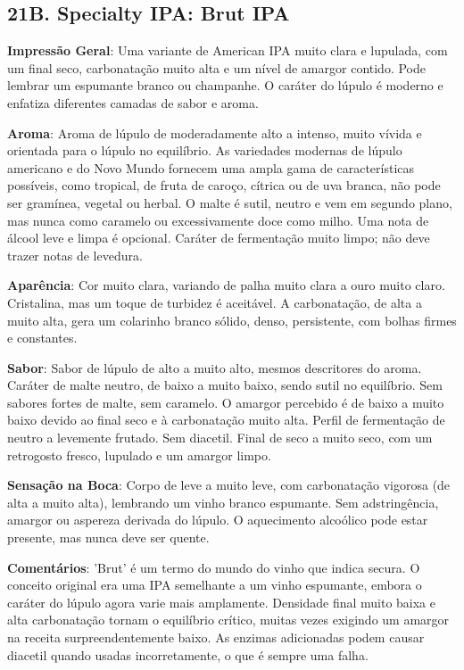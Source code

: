 \subsection*{21B. Specialty IPA: Brut IPA}
\textbf{Impressão Geral}: Uma variante de American IPA muito clara e lupulada, com um final seco, carbonatação muito alta e um nível de amargor contido. Pode lembrar um espumante branco ou champanhe. O caráter do lúpulo é moderno e enfatiza diferentes camadas de sabor e aroma.

\textbf{Aroma}: Aroma de lúpulo de moderadamente alto a intenso, muito vívida e orientada para o lúpulo no equilíbrio. As variedades modernas de lúpulo americano e do Novo Mundo fornecem uma ampla gama de características possíveis, como tropical, de fruta de caroço, cítrica ou de uva branca, não pode ser gramínea, vegetal ou herbal. O malte é sutil, neutro e vem em segundo plano, mas nunca como caramelo ou excessivamente doce como milho. Uma nota de álcool leve e limpa é opcional. Caráter de fermentação muito limpo; não deve trazer notas de levedura.

\textbf{Aparência}: Cor muito clara, variando de palha muito clara a ouro muito claro. Cristalina, mas um toque de turbidez é aceitável. A carbonatação, de alta a muito alta, gera um colarinho branco sólido, denso, persistente, com bolhas firmes e constantes.

\textbf{Sabor}: Sabor de lúpulo de alto a muito alto, mesmos descritores do aroma. Caráter de malte neutro, de baixo a muito baixo, sendo sutil no equilíbrio. Sem sabores fortes de malte, sem caramelo. O amargor percebido é de baixo a muito baixo devido ao final seco e à carbonatação muito alta. Perfil de fermentação de neutro a levemente frutado. Sem diacetil. Final de seco a muito seco, com um retrogosto fresco, lupulado e um amargor limpo.

\textbf{Sensação na Boca}: Corpo de leve a muito leve, com carbonatação vigorosa (de alta a muito alta), lembrando um vinho branco espumante. Sem adstringência, amargor ou aspereza derivada do lúpulo. O aquecimento alcoólico pode estar presente, mas nunca deve ser quente.

\textbf{Comentários}: 'Brut' é um termo do mundo do vinho que indica secura. O conceito original era uma IPA semelhante a um vinho espumante, embora o caráter do lúpulo agora varie mais amplamente. Densidade final muito baixa e alta carbonatação tornam o equilíbrio crítico, muitas vezes exigindo um amargor na receita surpreendentemente baixo. As enzimas adicionadas podem causar diacetil quando usadas incorretamente, o que é sempre uma falha.

